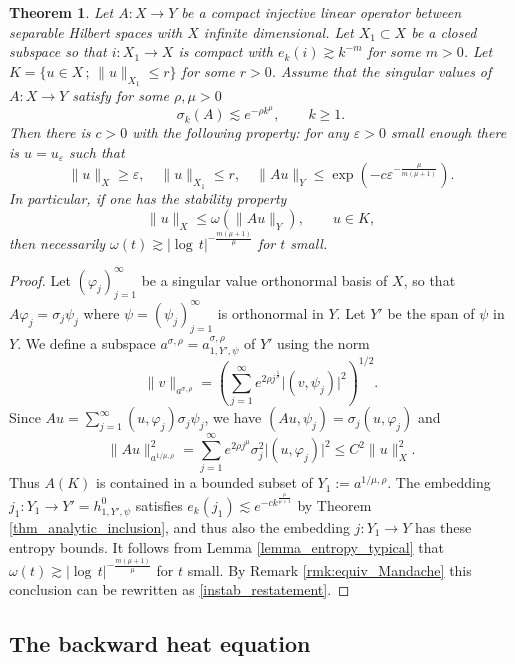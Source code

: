 \documentclass[12pt,twoside]{amsart}
\numberwithin{equation}{section}
\renewcommand{\leq}{\leqslant}
\renewcommand{\geq}{\geqslant}
\newtheorem{theorem}{Theorem}[section]
\newcommand{\abs}[1]{\lvert #1 \rvert}          %
\newcommand{\norm}[1]{\lVert #1 \rVert}         %
\newcommand{\eps}{\varepsilon}
\begin{document}
\begin{theorem} \label{thm_lowreg_instability_sobolev}
Let $A: X \to Y$ be a compact injective linear operator between separable Hilbert spaces with $X$ infinite dimensional. Let $X_1 \subset X$ be a closed subspace so that $i: X_1 \to X$ is compact with $e_k(i) \gtrsim k^{-m}$ for some $m > 0$. Let $K = \{ u \in X \,;\, \norm{u}_{X_1} \leq r \}$ for some $r > 0$. Assume that the singular values of $A: X \to Y$ satisfy for some $\rho, \mu > 0$ 
\[
\sigma_k(A) \lesssim e^{-\rho k^{\mu}}, \qquad k \geq 1.
\]
Then there is $c > 0$ with the following property: for any $\eps > 0$ small enough there is $u = u_{\eps}$ such that
\begin{equation} \label{instab_restatement}
\|u\|_{X} \geq \eps, \quad \|u\|_{X_1} \leq r, \quad \|Au\|_{Y} \leq \exp(-c \eps^{-\frac{\mu}{m(\mu+1)}}).
\end{equation}
In particular, if one has the stability property 
\[
\norm{u}_X \leq \omega(\norm{Au}_Y), \qquad u\in K,
\]
then necessarily $\omega(t) \gtrsim \abs{\log\,t}^{-\frac{m(\mu+1)}{\mu}}$ for $t$ small. 
\end{theorem}
\begin{proof}
Let $(\varphi_j)_{j=1}^{\infty}$ be a singular value orthonormal basis of $X$, so that $A \varphi_j = \sigma_j \psi_j$ where $\psi = (\psi_j)_{j=1}^{\infty}$ is orthonormal in $Y$. Let $Y'$ be the span of $\psi$ in $Y$. We define a subspace $a^{\sigma,\rho} = a^{\sigma,\rho}_{1,Y',\psi}$ of $Y'$ using the norm 
\[
\norm{v}_{a^{\sigma,\rho}} = \left( \sum_{j=1}^{\infty} e^{2\rho j^{\frac{1}{\sigma}}} \abs{(v,\psi_j)}^2 \right)^{1/2}.
\]
Since $Au = \sum_{j=1}^{\infty} (u,\varphi_j) \sigma_j \psi_j$, we have $(Au, \psi_j) = \sigma_j (u,\varphi_j)$ and 
\[
\norm{Au}_{a^{1/\mu,\rho}}^2 = \sum_{j=1}^{\infty} e^{2\rho j^{\mu}} \sigma_j^2 \abs{(u,\varphi_j)}^2 \leq C^2 \norm{u}_{X}^2.
\]
Thus $A(K)$ is contained in a bounded subset of $Y_1 := a^{1/\mu, \rho}$. The embedding $j_1: Y_1 \to Y' = h^0_{1,Y',\psi}$ satisfies $e_k(j_1) \lesssim e^{-c k^{\frac{\mu}{\mu+1}}}$ by Theorem \ref{thm_analytic_inclusion}, and thus also the embedding $j: Y_1 \to Y$ has these entropy bounds. It follows from Lemma \ref{lemma_entropy_typical} that $\omega(t) \gtrsim \abs{\log\,t}^{-\frac{m(\mu+1)}{\mu}}$ for $t$ small. By Remark \ref{rmk:equiv_Mandache} this conclusion can be rewritten as \eqref{instab_restatement}.
\end{proof}



\subsection{The backward heat equation}
\label{sec:back_heat}
\end{document}
